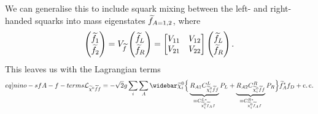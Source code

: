 \documentclass[english, notitlepage]{article}
\begin{document}
We can generalise this to include squark mixing between the left- and
right-handed squarks into mass eigenstates \(\widetilde{f}_{A=1,2}\), where
\begin{align}
    \begin{pmatrix}
        \widetilde{f}_1 \\
        \widetilde{f}_2
    \end{pmatrix}
    =
    V_{\widetilde{f}} \begin{pmatrix}
                       \widetilde{f}_L \\
                       \widetilde{f}_R
                   \end{pmatrix}
    =
    \begin{bmatrix}
        V_{11} & V_{12} \\
        V_{21} & V_{22}
    \end{bmatrix}
    \begin{pmatrix}
        \widetilde{f}_L \\
        \widetilde{f}_R
    \end{pmatrix}.
\end{align}
This leaves us with the Lagrangian terms
\begin{align}
    \label[eq]{nino-sfA-f-terms}
    \L_{\nino[] \wtilde{f} f} = -\sqrt{2} g \sum_{i} \sum_{A} \wbar{\wtilde{\chi}}^0_i & \Big\{ \underbrace{R_{A1} C_{\nino[i] \wtilde{f} f}^{L}}_{\equiv C_{\nino[i] \wtilde{f}_A f}^{L\ast}} P_L + \underbrace{R_{A2} C_{\nino[i] \wtilde{f} f}^{R}}_{\equiv C_{\nino[i] \wtilde{f}_A f}^{R\ast}} P_R \Big\} \wtilde{f}_A^\ast f_D + \cc \\
\end{align}
\end{document}
